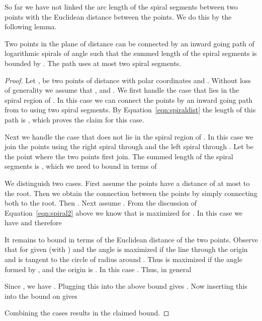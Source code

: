\documentclass{journalA4}
\begin{document}
So far we have not linked the arc length of the spiral segments between two points with the Euclidean distance between the points. We do this by the following lemma.
\begin{lemma}
Two points in the plane of distance  can be connected by an inward going path of logarithmic spirals of angle  such that the summed length of the spiral segments is bounded by . The path uses at most two spiral segments.
\end{lemma}
\begin{proof}
Let ,  be two points of distance  with polar coordinates  and . Without loss of generality we assume that ,  and . We first handle the case that  lies in the spiral region of . In this case we can connect the points by an inward going path from  to  using two spiral segments. By Equation~\ref{eqn:spiraldist} the length of this path is , which proves the claim for this case.

Next we handle the case that  does not lie in the spiral region of . In this case we join the points using the right spiral through  and the left spiral through . Let  be the point where the two points first join. The summed length of the spiral segments is , which we need to bound in terms of 

We distinguish two cases. First assume the points have a distance of at most  to the root. Then we obtain the connection between the points by simply connecting both to the root. Then .
Next assume .
From the discussion of Equation~\ref{eqn:spiral2} above we know that  is maximized for . In this case we have  and therefore

It remains to bound  in terms of the Euclidean distance  of the two points. Observe that for given  (with ) and  the angle  is maximized if the line through the origin and  is tangent to the circle of radius  around . Thus  is maximized if the angle formed by ,  and the origin is . In this case . Thus, in general

Since , we have . Plugging this into the above bound gives . Now inserting this into the bound on  gives

Combining the cases results in the claimed bound.
\end{proof}
\end{document}
